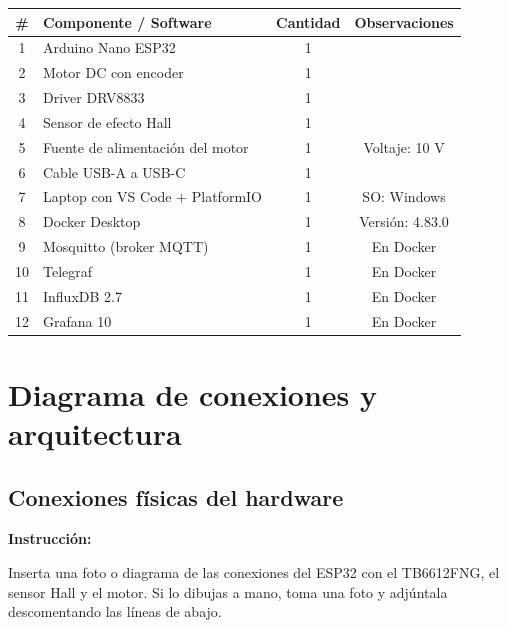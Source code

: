 \documentclass[11pt, letterpaper]{article}
\newenvironment{instruccion}{%
  \begin{mdframed}[backgroundcolor=tealLight,linecolor=tealMain,linewidth=1pt,
    innerleftmargin=10pt,innerrightmargin=10pt,
    innertopmargin=6pt,innerbottommargin=6pt]
  \small\textbf{\color{tealMain}Instrucci\'on:}\hspace{4pt}
}{\end{mdframed}}
\begin{document}
\begin{table}[H]
  \centering
  \begin{tabular}{clcc}
    \toprule
    \textbf{\#} & \textbf{Componente / Software} &
    \textbf{Cantidad} & \textbf{Observaciones} \\
    \midrule
    1  & Arduino Nano ESP32& 1 & \\[0.4em]
    2  & Motor DC con encoder       & 1 & \\[0.4em]
    3  & Driver DRV8833& 1 & \\[0.4em]
    4  & Sensor de efecto Hall      & 1 & \\[0.4em]
    5  & Fuente de alimentaci\'on del motor & 1 & Voltaje: 10 V\\[0.4em]
    6  & Cable USB-A a USB-C& 1 & \\[0.4em]
    7  & Laptop con VS Code + PlatformIO & 1 & SO: Windows\\[0.4em]
    8  & Docker Desktop             & 1 & Versi\'on: 4.83.0\\[0.4em]
    9  & Mosquitto (broker MQTT)    & 1 & En Docker \\[0.4em]
    10 & Telegraf                   & 1 & En Docker \\[0.4em]
    11 & InfluxDB 2.7               & 1 & En Docker \\[0.4em]
    12 & Grafana 10                 & 1 & En Docker \\[0.4em]
    \bottomrule
  \end{tabular}
\end{table}

\section{Diagrama de conexiones y arquitectura}

\subsection{Conexiones físicas del hardware}

\begin{instruccion}
  Inserta una foto o diagrama de las conexiones del ESP32 con el
  TB6612FNG, el sensor Hall y el motor. Si lo dibujas a mano,
  toma una foto y adjúntala descomentando las líneas de abajo.
\end{instruccion}
\end{document}
